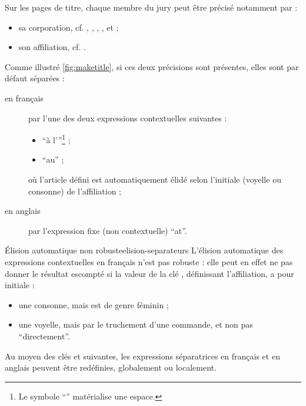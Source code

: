 Sur les pages de titre, chaque membre du jury peut être précisé notamment par :
\begin{itemize}
\item sa corporation, cf. , , ,
  ,  et
   ;
\item son affiliation, cf. .
\end{itemize}
Comme illustré \vref{fig:maketitle}, si ces deux précisions sont présentes,
elles sont par défaut séparées :
\begin{description}
\item[en français] par l'une des deux expressions contextuelles suivantes :
  \begin{itemize}
  \item \enquote{\textvisiblespace{}à l'}\footnote{Le symbole
      \enquote{\textvisiblespace{}} matérialise une espace.} ;
  \item \enquote{\textvisiblespace{}au\textvisiblespace{}} ;
  \end{itemize}
  où l'article défini est automatiquement élidé selon l'initiale (voyelle ou
  consonne) de l'affiliation ;
\item[en anglais] par l'expression fixe (non contextuelle)
  \enquote{\textvisiblespace{}at\textvisiblespace{}}.
\end{description}

\begin{dbwarning}{Élision automatique non robuste}{elision-separateurs}
  L'élision automatique des expressions contextuelles en français n'est pas
  robuste : elle peut en effet ne pas donner le résultat escompté si la valeur
  de la clé , définissant l'affiliation, a pour initiale :
  \begin{itemize}
  \item une consonne, mais est de genre féminin ;
  \item une voyelle, mais par le truchement d'une commande\commandeacronyme, et
    non pas \enquote{directement}.
  \end{itemize}
\end{dbwarning}

Au moyen des clés  et 
suivantes, les expressions séparatrices en français et en anglais peuvent être
redéfinies, globalement ou localement.

